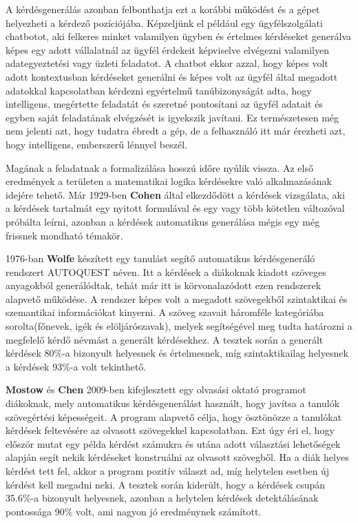 A kérdésgenerálás azonban felbonthatja ezt a korábbi működést és a gépet helyezheti a kérdező pozíciójába. Képzeljünk el például egy ügyfélszolgálati chatbotot, aki felkeres minket valamilyen ügyben és értelmes kérdéseket generálva képes egy adott vállalatnál az ügyfél érdekeit képviselve elvégezni valamilyen adategyeztetési vagy üzleti feladatot. A chatbot ekkor azzal, hogy képes volt adott kontextusban kérdéseket generálni és képes volt az ügyfél által megadott adatokkal kapcsolatban kérdezni egyértelmű tanúbizonyságát adta, hogy intelligens, megértette feladatát és szeretné pontosítani az ügyfél adatait és egyben saját feladatának elvégzését is igyekszik javítani. Ez természetesen még nem jelenti azt, hogy tudatra ébredt a gép, de a felhasználó itt már érezheti azt, hogy intelligens, emberszerű lénnyel beszél.


Magának a feladatnak a formalizálása hosszú időre nyúlik vissza. Az első eredmények a területen a matematikai logika kérdésekre való alkalmazásának idejére tehető. Már 1929-ben \textbf{Cohen} által elkezdődött a kérdések vizsgálata, aki a kérdések tartalmát egy nyitott formulával és egy vagy több kötetlen változóval próbálta leírni\cite{question_generation}, azonban a kérdések automatikus generálása mégis egy még frissnek mondható témakör.

1976-ban \textbf{Wolfe} készített egy tanulást segítő automatikus kérdésgeneráló rendszert AUTOQUEST néven.\cite{autoquest} Itt a kérdések a diákoknak kiadott szöveges anyagokból generálódtak, tehát már itt is körvonalazódott ezen rendszerek alapvető működése. A rendszer képes volt a megadott szövegekből szintaktikai és szemantikai információkat kinyerni. A szöveg szavait háromféle kategóriába sorolta(főnevek, igék és elöljárószavak), melyek segítségével meg tudta határozni a megfelelő kérdő névmást a generált kérdésekhez. A tesztek során a generált kérdések 80\%-a bizonyult helyesnek és értelmesnek, míg szintaktikailag helyesnek a kérdések 93\%-a volt tekinthető.

\textbf{Mostow} és \textbf{Chen} 2009-ben kifejlesztett egy olvasási oktató programot diákoknak, mely automatikus kérdésgenerálást használt, hogy javítsa a tanulók szövegértési képességeit.\cite{reading_tutor} A program alapvető célja, hogy ösztönözze a tanulókat kérdések feltevésére az olvasott szövegekkel kapcsolatban. Ezt úgy éri el, hogy először mutat egy példa kérdést számukra és utána adott választási lehetőségek alapján segít nekik kérdéseket konstruálni az olvasott szövegből. Ha a diák helyes kérdést tett fel, akkor a program pozitív választ ad, míg helytelen esetben új kérdést kell megadni neki. A tesztek során kiderült, hogy a kérdések csupán 35.6\%-a bizonyult helyesnek, azonban a helytelen kérdések detektálásának pontossága 90\% volt, ami nagyon jó eredménynek számított.

